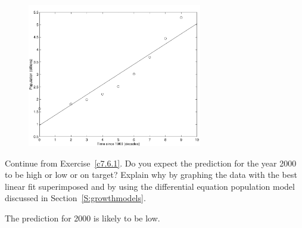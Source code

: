 \documentclass{ximera}
\begin{document}
\begin{computerExercise}
\begin{solution}
\begin{figure}[htb]
		\centerline{%
		\includegraphics[width=3.0in]{exfigure/7-6-1.pdf}}
\end{figure}

\end{solution}
\end{computerExercise}


\begin{computerExercise} \label{c7.6.1C}
Continue from Exercise~\ref{c7.6.1}.
Do you expect the prediction for the year 2000 to be high or low
or on target? Explain why by graphing the data with the best linear fit
superimposed and by using the differential equation population model
discussed in Section~\ref{S:growthmodels}.

\begin{solution}
\ans The prediction for 2000 is likely to be low.

\end{solution}
\end{computerExercise}
\end{document}
